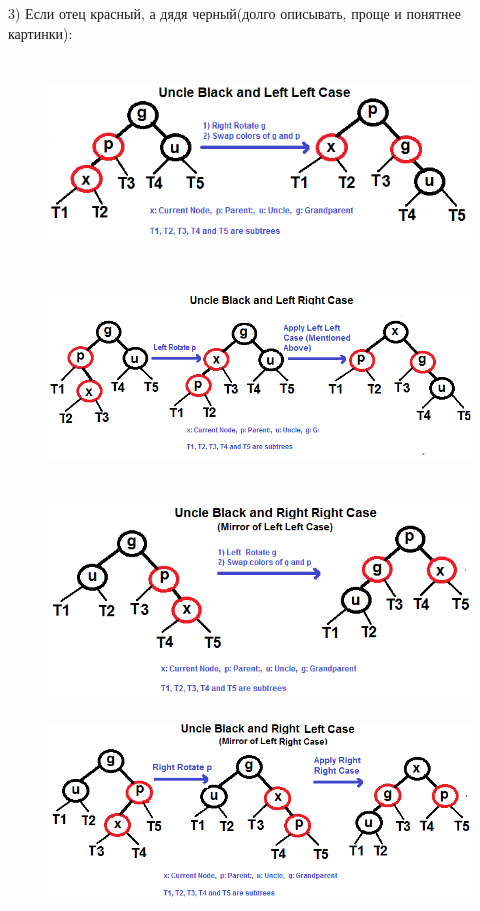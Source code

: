 \documentclass[12pt]{article}
\begin{document}
3) Если отец красный, а дядя черный(долго описывать, проще и понятнее картинки):
\begin{figure}[ht!]
    \includegraphics[height=5.5cm,width=.45\textwidth]{redBlackCase3a1.png}\hfill
    \includegraphics[height=5.5cm,width=.45\textwidth]{redBlackCase3b.png}
\end{figure}
\begin{figure}[ht!]
    \includegraphics[height=5.5cm,width=.45\textwidth]{redBlackCase3c.png}\hfill
    \includegraphics[height=5.5cm,width=.45\textwidth]{redBlackCase3d.png}
\end{figure}
\end{document}
